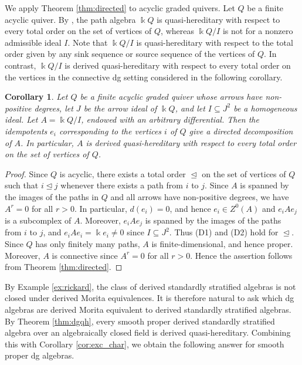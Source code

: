 \documentclass[a4paper,reqno,11pt]{amsart}
\numberwithin{equation}{section}
\newtheorem{corollary}[theorem]{Corollary}
\theoremstyle{definition}
\newcommand{\kk}{\Bbbk}
\begin{document}
We apply Theorem \ref{thm:directed} to acyclic graded quivers.
Let $Q$ be a finite acyclic quiver.
By \cite{DR89}, the path algebra $\kk Q$ is quasi-hereditary with respect to every total order on the set of vertices of $Q$, whereas $\kk Q/I$ is not for a nonzero admissible ideal $I$.
Note that $\kk Q/I$ is quasi-hereditary with respect to the total order given by any sink sequence or source sequence of the vertices of $Q$.
In contrast, $\kk Q/I$ is derived quasi-hereditary with respect to every total order on the vertices in the connective dg setting considered in the following corollary.

\begin{corollary}\label{cor:acyclic}
Let $Q$ be a finite acyclic graded quiver whose arrows have non-positive degrees, let $J$ be the arrow ideal of $\kk Q$, and let $I\subseteq J^{2}$ be a homogeneous ideal.
Let $A=\kk Q/I$, endowed with an arbitrary differential.
Then the idempotents $e_{i}$ corresponding to the vertices $i$ of $Q$ give a directed decomposition of $A$.
In particular, $A$ is derived quasi-hereditary with respect to every total order on the set of vertices of $Q$.
\end{corollary}
\begin{proof}
Since $Q$ is acyclic, there exists a total order $\trianglelefteq$ on the set of vertices of $Q$ such that $i\trianglelefteq j$ whenever there exists a path from $i$ to $j$.
Since $A$ is spanned by the images of the paths in $Q$ and all arrows have non-positive degrees, we have $A^{r}=0$ for all $r>0$.
In particular, $d(e_{i})=0$, and hence $e_{i}\in Z^{0}(A)$ and $e_{i}Ae_{j}$ is a subcomplex of $A$.
Moreover, $e_{i}Ae_{j}$ is spanned by the images of the paths from $i$ to $j$, and $e_{i}Ae_{i}=\kk e_{i}\neq 0$ since $I\subseteq J^{2}$.
Thus (D1) and (D2) hold for $\trianglelefteq$.
Since $Q$ has only finitely many paths, $A$ is finite-dimensional, and hence proper.
Moreover, $A$ is connective since $A^{r}=0$ for all $r>0$.
Hence the assertion follows from Theorem \ref{thm:directed}.
\end{proof}

By Example \ref{ex:rickard}, the class of derived standardly stratified algebras is not closed under derived Morita equivalences.
It is therefore natural to ask which dg algebras are derived Morita equivalent to derived standardly stratified algebras.
By Theorem \ref{thm:dgqh}, every smooth proper derived standardly stratified algebra over an algebraically closed field is derived quasi-hereditary.
Combining this with Corollary \ref{cor:exc_char}, we obtain the following answer for smooth proper dg algebras.
\end{document}
